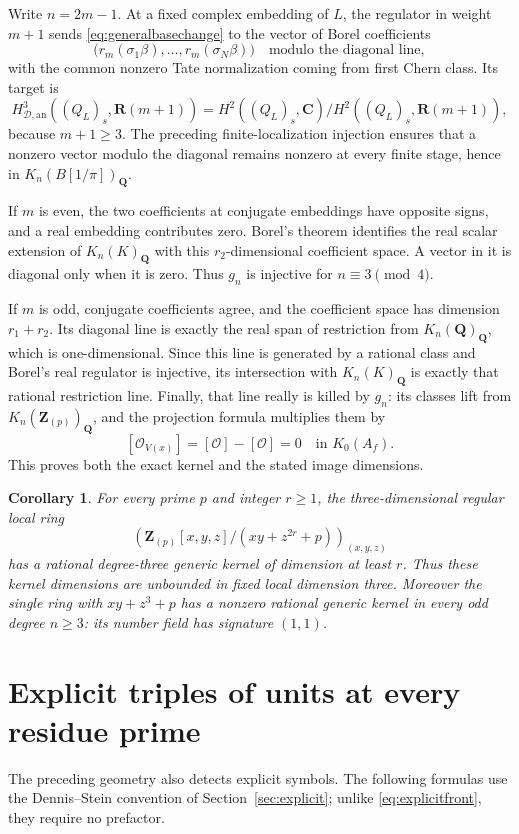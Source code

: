 \documentclass[11pt,a4paper]{article}
\newtheorem{corollary}[theorem]{Corollary}
\theoremstyle{remark}
\newcommand{\Q}{\mathbf Q}
\newcommand{\Z}{\mathbf Z}
\newcommand{\R}{\mathbf R}
\newcommand{\C}{\mathbf C}
\newcommand{\OO}{\mathcal O}
\newcommand{\HD}{H_{\mathcal D,\mathrm{an}}}
\begin{document}
Write $n=2m-1$. At a fixed complex embedding of $L$, the regulator in weight $m+1$ sends \eqref{eq:generalbasechange} to the vector of Borel coefficients
\[
\bigl(r_m(\sigma_1\beta),\ldots,r_m(\sigma_N\beta)\bigr)
\quad\text{modulo the diagonal line},
\]
with the common nonzero Tate normalization coming from first Chern class. Its target is
\[
\HD^3((Q_L)_s,\R(m+1))
=H^2((Q_L)_s,\C)/H^2((Q_L)_s,\R(m+1)),
\]
because $m+1\geq3$. The preceding finite-localization injection ensures that a nonzero vector modulo the diagonal remains nonzero at every finite stage, hence in $K_n(B[1/\pi])_{\Q}$.

If $m$ is even, the two coefficients at conjugate embeddings have opposite signs, and a real embedding contributes zero. Borel's theorem identifies the real scalar extension of $K_n(K)_{\Q}$ with this $r_2$-dimensional coefficient space. A vector in it is diagonal only when it is zero. Thus $g_n$ is injective for $n\equiv3\pmod4$.

If $m$ is odd, conjugate coefficients agree, and the coefficient space has dimension $r_1+r_2$. Its diagonal line is exactly the real span of restriction from $K_n(\Q)_{\Q}$, which is one-dimensional. Since this line is generated by a rational class and Borel's real regulator is injective, its intersection with $K_n(K)_{\Q}$ is exactly that rational restriction line. Finally, that line really is killed by $g_n$: its classes lift from $K_n(\Z_{(p)})_{\Q}$, and the projection formula multiplies them by
\[
[\OO_{V(x)}]=[\OO]-[\OO]=0\quad\text{in }K_0(A_f).
\]
This proves both the exact kernel and the stated image dimensions.

\begin{corollary}
For every prime $p$ and integer $r\geq1$, the three-dimensional regular local ring
\[
\left(\Z_{(p)}[x,y,z]/(xy+z^{2r}+p)\right)_{(x,y,z)}
\]
has a rational degree-three generic kernel of dimension at least $r$. Thus these kernel dimensions are unbounded in fixed local dimension three. Moreover the single ring with $xy+z^3+p$ has a nonzero rational generic kernel in every odd degree $n\geq3$: its number field has signature $(1,1)$.
\end{corollary}

\section{Explicit triples of units at every residue prime}\label{sec:explicitallprimes}

The preceding geometry also detects explicit symbols. The following formulas use the Dennis--Stein convention of Section~\ref{sec:explicit}; unlike \eqref{eq:explicitfront}, they require no prefactor.
\end{document}

